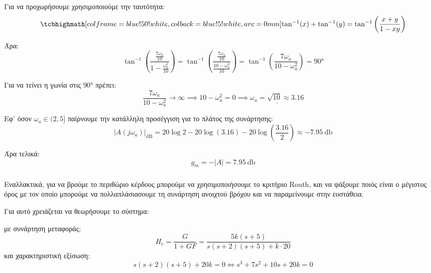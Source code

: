 \documentclass[11pt,a4paper,notitlepage,fleqn]{article}
\begin{document}
\begin{exercise}
\begin{enumgreekparen}
	Για να προχωρήσουμε χρησιμοποιούμε την ταυτότητα:
	\[
	\infoboxed{
		\tan^{-1}(x) + \tan^{-1}(y) = \tan^{-1} \left( \frac{x+y}{1-xy} \right)	
	}
	\]
	
	Άρα:
	\[
	\tan^{-1}\left(\frac{\frac{7\omega_a}{10}}{1-\frac{\omega_a^2}{10}}\right)
	= \tan^{-1}\left(\frac{\frac{7\omega_a}{10}}{\frac{10-\omega_a^2}{10}}\right)
	= \tan^{-1}\left(\frac{7\omega_a}{10-\omega_a^2}\right) = \ang{90}
	\]
	
	Για να τείνει η γωνία στις \( \ang{90} \) πρέπει:
	\[
	\frac{7\omega_a}{10-\omega_a^2} \to \infty \implies 10-\omega_a^2 = 0 \implies \underline{\omega_a = \sqrt{10} \approx 3.16}
	\]
	
	Εφ' όσον \( \omega_a \in (2,5] \) παίρνουμε την κατάλληλη προσέγγιση για το πλάτος της συνάρτησης:
	\[
	\left| A(j\omega_a) \right|_{\mathrm{dB}} = 20\log 2-20\log(3.16)-20\log\left(\frac{3.16}{2}\right) \approx
	\SI{-7.95}{\decibel}
	\]
	
	Άρα τελικά:
	\[
	g_m = - |A| = \SI{7.95}{\decibel}
	\]
	
	\subparagraph{}
	Εναλλακτικά, για να βρούμε το περιθώριο κέρδους μπορούμε να χρησιμοποιήσουμε το κριτήριο Routh, και να ψάξουμε ποιός
	είναι ο μέγιστος όρος με τον οποίο μπορούμε να πολλαπλάσιασουμε τη συνάρτηση ανοιχτού βρόχου και να παραμείνουμε στην
	ευστάθεια.
	
	Για αυτό χρειάζεται να θεωρήσουμε το σύστημα:
	
	
	με συνάρτηση μεταφοράς:
	\[
	H_c = \frac{G}{1+GF} = \frac{5k(s+5)}{s(s+2)(s+5)+k\cdot 20}
	\]
	και χαρακτηριστική εξίσωση:
	\[ s(s+2)(s+5)+20k = 0 \iff s^3+7s^2+10s+20k = 0 \]
	

\end{enumgreekparen}
\end{exercise}
\end{document}

